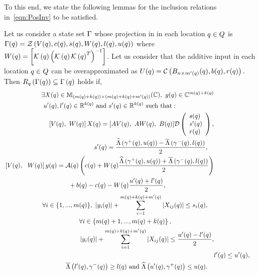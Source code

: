 To this end, we state the following lemmas for the inclusion relations
in~\ref{eqn:PosInv} to be satisfied.
\begin{lemma}
  Let  
  us consider a state set $\Gamma$ whose projection in in each
  location $q\in Q$ is $\Gamma(q) =
  \mathcal{Z}\left(V(q),c(q),s(q),W(q),l(q),u(q)\right)$ where
  $W(q)={\left[\mathcal{K}\left(q\right)\left(\mathcal{K}\left(q\right)\mathcal{K}\left(q\right)^T\right)^{-1}\right]}$.  Let us consider that the additive input in each location
  $q\in Q$ can be overapproximated as $U(q) = \mathcal{C}\left(B_{n\times
      m^\prime(q)}(q),b(q),r(q)\right)$.  Then
   $R_{q}\left(\Gamma(q)\right)
  \subseteq \Gamma\left(q\right)$ holds if,
\begin{align}
\begin{split}
& \exists
  X(\loc)\in\mat{\lt(m(\loc)+k(\loc)\rt)}{\lt(m(\loc)+k(\loc)+m^\pr(\loc)\rt)}{\mb{C}},~
  y(\loc)\in\mb{C}^{m(\loc)+k(\loc)}\\&~u^\pr(\loc),l^\pr(\loc)\in\realset^{k(\loc)}~\text{and}~s^\pr(\loc)\in\realset^{k(\loc)}~\text{such
    that}:
\end{split}\\
\begin{split}
& \left[V(\loc),~W(\loc)\rt]X(\loc) =
  [AV(\loc),~AW(\loc),~B(\loc)]\dg\lt(\cjoin{s(\loc)}{s^\pr(\loc)}{r(\loc)}\rt),\\
\end{split}\\
\begin{split}
& s^\pr(\loc) = \frac{\minaffine{\stay^+(\loc)}{u(\loc)}
      -\maxaffine{\stay^-(\loc)}{l(\loc)}}{2},
\end{split}\\
\begin{split}
  & \left[V(\loc),~~W(\loc)\rt]y(\loc) = 
    \map(\loc)\lt(c(\loc)+W(\loc)\frac{\minaffine{\stay^+(\loc)}{u(\loc)}
     +\maxaffine{\stay^-(\loc)}{l(\loc)}}{2}\rt)\\ & \hspace{10em} +
  b(\loc)-c(\loc)-W(\loc)\frac{u^\pr(\loc)+l^\pr(\loc)}{2},
\end{split}\\
\begin{split}
& \forall
i\in\tup{m(\loc)},~\lt|y_i(\loc)\rt|+\sum_{i=1}^{m(\loc)+k(\loc)+m^\pr(\loc)}\lt|X_{ij}(\loc)\rt|\leq
s_i(\loc),
\end{split}\\
\begin{split}
& \forall
i\in\lt\{m(\loc)+1,...,m(\loc)+k(\loc)\rt\},\\
&\lt|y_i(\loc)\rt|+\sum_{i=1}^{m(\loc)+k(\loc)+m^\pr(\loc)}\lt|X_{ij}(\loc)\rt|\leq
\frac{u^\pr(\loc)-l^\pr(\loc)}{2},
\end{split}\\
& l^\pr(\loc)\leq u^\pr(\loc),\\
\begin{split}
& \maxaffine{l^\pr(\loc)}{\stay^-(\loc)}\geq
l(\loc)~\text{and}~\minaffine{u^\pr(\loc)}{\stay^+(\loc)}\leq u(\loc).
\end{split}
\end{align}
\end{lemma}

